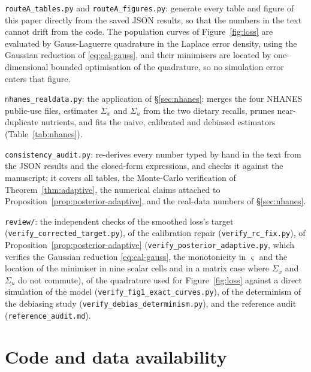 \documentclass[12pt,a4paper]{article}
\theoremstyle{definition}
\theoremstyle{remark}
\begin{document}
\texttt{routeA\_\allowbreak tables.py} and \texttt{routeA\_\allowbreak figures.py}: generate every table
and figure of this paper directly from the saved JSON results, so that the numbers in the
text cannot drift from the code. The population curves of Figure~\ref{fig:loss} are
evaluated by Gauss-Laguerre quadrature in the Laplace error density, using the Gaussian
reduction of \eqref{eq:cal-gauss}, and their minimisers are located by one-dimensional
bounded optimisation of the quadrature, so no simulation error enters that figure.

\texttt{nhanes\_\allowbreak realdata.py}: the application of \S\ref{sec:nhanes}: merges the
four NHANES public-use files, estimates $\Sigma_x$ and $\Sigma_u$ from the two dietary
recalls, prunes near-duplicate nutrients, and fits the naive, calibrated and debiased
estimators (Table~\ref{tab:nhanes}).

\texttt{consistency\_\allowbreak audit.py}: re-derives every number typed by hand in the text
from the JSON results and the closed-form expressions, and checks it against the
manuscript; it covers all tables, the Monte-Carlo verification of
Theorem~\ref{thm:adaptive}, the numerical claims attached to
Proposition~\ref{prop:posterior-adaptive}, and the real-data numbers of
\S\ref{sec:nhanes}.

\texttt{review/}: the independent checks of the smoothed loss's target
(\texttt{verify\_\allowbreak corrected\_\allowbreak target.py}), of the calibration repair
(\texttt{verify\_\allowbreak rc\_\allowbreak fix.py}), of Proposition~\ref{prop:posterior-adaptive}
(\texttt{verify\_\allowbreak posterior\_\allowbreak adaptive.py}, which verifies the Gaussian reduction
\eqref{eq:cal-gauss}, the monotonicity in $\varsigma$ and the location of the minimiser in
nine scalar cells and in a matrix case where $\Sigma_x$ and $\Sigma_u$ do not commute), of
the quadrature used for Figure~\ref{fig:loss} against a direct simulation of the model
(\texttt{verify\_\allowbreak fig1\_\allowbreak exact\_\allowbreak curves.py}), of the determinism of the debiasing study
(\texttt{verify\_\allowbreak debias\_\allowbreak determinism.py}), and the reference audit
(\texttt{reference\_\allowbreak audit.md}).
\fussy

\section*{Code and data availability}
\end{document}
